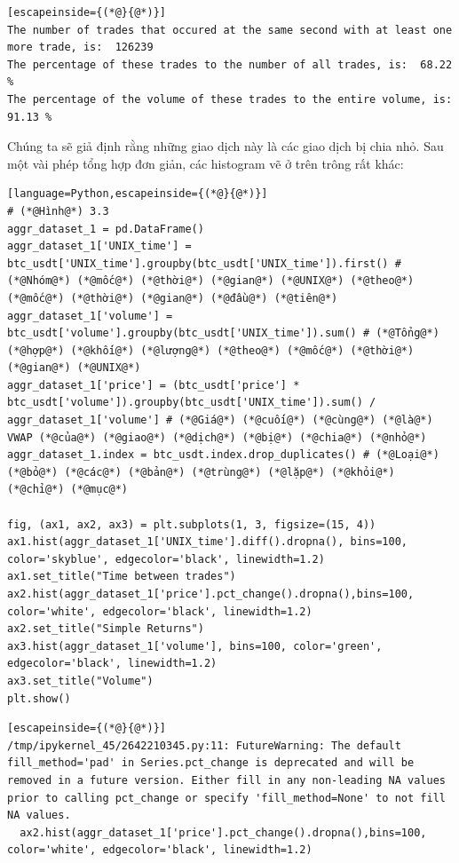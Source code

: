 \begin{lstlisting}[escapeinside={(*@}{@*)}]
The number of trades that occured at the same second with at least one more trade, is:  126239
The percentage of these trades to the number of all trades, is:  68.22 %
The percentage of the volume of these trades to the entire volume, is:  91.13 %
\end{lstlisting}

Chúng ta sẽ giả định rằng những giao dịch này là các giao dịch bị chia nhỏ. Sau một vài phép tổng hợp đơn giản, các histogram vẽ ở trên trông rất khác:

\begin{lstlisting}[language=Python,escapeinside={(*@}{@*)}]
# (*@Hình@*) 3.3
aggr_dataset_1 = pd.DataFrame()
aggr_dataset_1['UNIX_time'] = btc_usdt['UNIX_time'].groupby(btc_usdt['UNIX_time']).first() # (*@Nhóm@*) (*@mốc@*) (*@thời@*) (*@gian@*) (*@UNIX@*) (*@theo@*) (*@mốc@*) (*@thời@*) (*@gian@*) (*@đầu@*) (*@tiên@*)
aggr_dataset_1['volume'] = btc_usdt['volume'].groupby(btc_usdt['UNIX_time']).sum() # (*@Tổng@*) (*@hợp@*) (*@khối@*) (*@lượng@*) (*@theo@*) (*@mốc@*) (*@thời@*) (*@gian@*) (*@UNIX@*)
aggr_dataset_1['price'] = (btc_usdt['price'] * btc_usdt['volume']).groupby(btc_usdt['UNIX_time']).sum() / aggr_dataset_1['volume'] # (*@Giá@*) (*@cuối@*) (*@cùng@*) (*@là@*) VWAP (*@của@*) (*@giao@*) (*@dịch@*) (*@bị@*) (*@chia@*) (*@nhỏ@*)
aggr_dataset_1.index = btc_usdt.index.drop_duplicates() # (*@Loại@*) (*@bỏ@*) (*@các@*) (*@bản@*) (*@trùng@*) (*@lặp@*) (*@khỏi@*) (*@chỉ@*) (*@mục@*)

fig, (ax1, ax2, ax3) = plt.subplots(1, 3, figsize=(15, 4))
ax1.hist(aggr_dataset_1['UNIX_time'].diff().dropna(), bins=100, color='skyblue', edgecolor='black', linewidth=1.2)
ax1.set_title("Time between trades")
ax2.hist(aggr_dataset_1['price'].pct_change().dropna(),bins=100, color='white', edgecolor='black', linewidth=1.2)
ax2.set_title("Simple Returns")
ax3.hist(aggr_dataset_1['volume'], bins=100, color='green', edgecolor='black', linewidth=1.2)
ax3.set_title("Volume")
plt.show()
\end{lstlisting}

\begin{lstlisting}[escapeinside={(*@}{@*)}]
/tmp/ipykernel_45/2642210345.py:11: FutureWarning: The default fill_method='pad' in Series.pct_change is deprecated and will be removed in a future version. Either fill in any non-leading NA values prior to calling pct_change or specify 'fill_method=None' to not fill NA values.
  ax2.hist(aggr_dataset_1['price'].pct_change().dropna(),bins=100, color='white', edgecolor='black', linewidth=1.2)
\end{lstlisting}

